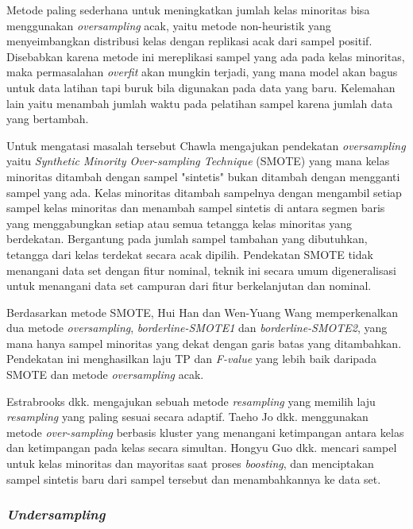 \documentclass[12pt,a4paper,titlepage]{article}
\begin{document}
Metode paling sederhana untuk meningkatkan jumlah kelas minoritas bisa menggunakan \textit{oversampling} acak, yaitu metode non-heuristik yang menyeimbangkan distribusi kelas dengan replikasi acak dari sampel positif.
Disebabkan karena metode ini mereplikasi sampel yang ada pada kelas minoritas, maka permasalahan \textit{overfit} akan mungkin terjadi, yang mana model akan bagus untuk data latihan tapi buruk bila digunakan pada data yang baru. 
Kelemahan lain yaitu menambah jumlah waktu pada pelatihan sampel karena jumlah data yang bertambah.

Untuk mengatasi masalah tersebut Chawla \cite{chawla2002smote} mengajukan pendekatan \textit{oversampling} yaitu \textit{Synthetic Minority Over-sampling Technique} (SMOTE) yang mana kelas minoritas ditambah dengan sampel "sintetis" bukan ditambah dengan mengganti sampel yang ada.
Kelas minoritas ditambah sampelnya dengan mengambil setiap sampel kelas minoritas dan menambah sampel sintetis di antara segmen baris yang menggabungkan setiap atau semua tetangga kelas minoritas yang berdekatan.
Bergantung pada jumlah sampel tambahan yang dibutuhkan, tetangga dari kelas terdekat secara acak dipilih.
Pendekatan SMOTE tidak menangani data set dengan fitur nominal, teknik ini secara umum digeneralisasi untuk menangani data set campuran dari fitur berkelanjutan dan nominal.

Berdasarkan metode SMOTE, Hui Han dan Wen-Yuang Wang \cite{han2005borderline} memperkenalkan dua metode \textit{oversampling}, \textit{borderline-SMOTE1} dan \textit{borderline-SMOTE2}, yang mana hanya sampel minoritas yang dekat dengan garis batas yang ditambahkan.
Pendekatan ini menghasilkan laju TP dan \textit{F-value} yang lebih baik daripada SMOTE dan metode \textit{oversampling} acak.

Estrabrooks dkk. \cite{estabrooks2004multiple} mengajukan sebuah metode \textit{resampling} yang memilih laju \textit{resampling} yang paling sesuai secara adaptif.
Taeho Jo dkk. \cite{jo2004class} menggunakan metode \textit{over-sampling} berbasis kluster yang menangani ketimpangan antara kelas dan ketimpangan pada kelas secara simultan.
Hongyu Guo dkk. \cite{guo2004learning} mencari sampel untuk kelas minoritas dan mayoritas saat proses \textit{boosting}, dan menciptakan sampel sintetis baru dari sampel tersebut dan menambahkannya ke data set.


\subsubsection{\textit{Undersampling}}\label{subsubsec:undersampling}
\end{document}
